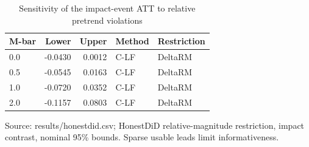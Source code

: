 \begin{table}[htbp]
\centering
\small
\caption{Sensitivity of the impact-event ATT to relative pretrend violations}
\begin{tabularx}{\linewidth}{Xrrll}
\toprule
M-bar & Lower & Upper & Method & Restriction \\
\midrule
0.0 & -0.0430 & 0.0012 & C-LF & DeltaRM \\
0.5 & -0.0545 & 0.0163 & C-LF & DeltaRM \\
1.0 & -0.0720 & 0.0352 & C-LF & DeltaRM \\
2.0 & -0.1157 & 0.0803 & C-LF & DeltaRM \\
\bottomrule
\end{tabularx}
\par\vspace{3pt}\begin{minipage}{\linewidth}\footnotesize Source: results/honestdid.\allowbreak{}csv; HonestDiD relative-magnitude restriction, impact contrast, nominal 95\% bounds.\allowbreak{} Sparse usable leads limit informativeness.\allowbreak{}\end{minipage}
\end{table}

